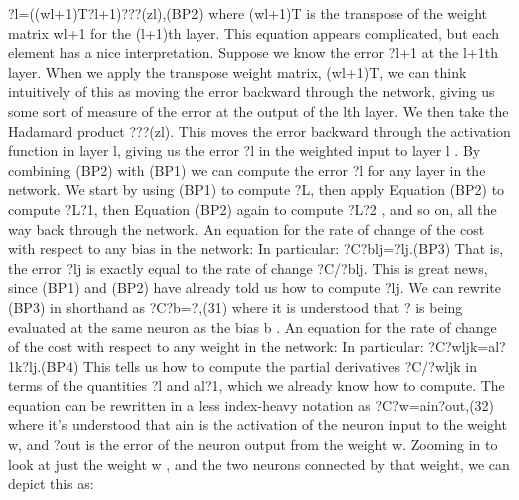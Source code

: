 ?l=((wl+1)T?l+1)???(zl),(BP2)
where (wl+1)T is the transpose of the weight matrix wl+1 for the (l+1)th layer. This equation appears complicated, but each element has a nice interpretation. Suppose we know the error ?l+1 at the l+1th layer. When we apply the transpose weight matrix, (wl+1)T, we can think intuitively of this as moving the error backward through the network, giving us some sort of measure of the error at the output of the lth layer. We then take the Hadamard product ???(zl). This moves the error backward through the activation function in layer l, giving us the error ?l in the weighted input to layer l
.
By combining (BP2) with (BP1) we can compute the error ?l
for any layer in the network. We start by using (BP1) to compute ?L, then apply Equation (BP2) to compute ?L?1, then Equation (BP2) again to compute ?L?2
, and so on, all the way back through the network.
An equation for the rate of change of the cost with respect to any bias in the network: In particular: 
?C?blj=?lj.(BP3)
That is, the error ?lj is exactly equal to the rate of change ?C/?blj. This is great news, since (BP1) and (BP2) have already told us how to compute ?lj. We can rewrite (BP3) in shorthand as 
?C?b=?,(31)
where it is understood that ? is being evaluated at the same neuron as the bias b
.
An equation for the rate of change of the cost with respect to any weight in the network: In particular: 
?C?wljk=al?1k?lj.(BP4)
This tells us how to compute the partial derivatives ?C/?wljk in terms of the quantities ?l and al?1, which we already know how to compute. The equation can be rewritten in a less index-heavy notation as 
?C?w=ain?out,(32)
where it's understood that ain is the activation of the neuron input to the weight w, and ?out is the error of the neuron output from the weight w. Zooming in to look at just the weight w
, and the two neurons connected by that weight, we can depict this as: 

